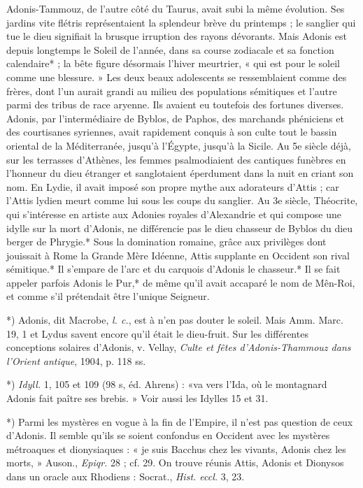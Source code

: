 \documentclass[a4paper, 11pt, oneside, polutonikogreek, french]{article}
\begin{document}
Adonis-Tammouz, de l'autre côté du Taurus, avait subi la même évolution. Ses jardins vite flétris représentaient la splendeur brève du printemps ; le sanglier qui tue le dieu signifiait la brusque irruption des rayons dévorants. Mais Adonis est depuis longtemps le Soleil de l'année, dans sa course zodiacale et sa fonction calendaire* ; la bête figure désormais l'hiver meurtrier, « qui est pour le soleil comme une blessure. » Les deux beaux adolescents se ressemblaient comme des frères, dont l'un aurait grandi au milieu des populations sémitiques et l'autre parmi des tribus de race aryenne. Ils avaient eu toutefois des fortunes diverses. Adonis, par l'intermédiaire de Byblos, de Paphos, des marchands phéniciens et des courtisanes syriennes, avait rapidement conquis à son culte tout le bassin oriental de la Méditerranée, jusqu'à l'Égypte, jusqu'à la Sicile. Au 5e siècle déjà, sur les terrasses d'Athènes, les femmes psalmodiaient des cantiques funèbres en l'honneur du dieu étranger et sanglotaient éperdument dans la nuit en criant son nom. En Lydie, il avait imposé son propre mythe aux adorateurs d'Attis ; car l'Attis lydien meurt comme lui sous les coups du sanglier. Au 3e siècle, Théocrite, qui s'intéresse en artiste aux Adonies royales d'Alexandrie et qui compose une idylle sur la mort d'Adonis, ne différencie pas le dieu chasseur de Byblos du dieu berger de Phrygie.* Sous la domination romaine, grâce aux privilèges dont jouissait à Rome la Grande Mère Idéenne, Attis supplante en Occident son rival sémitique.* Il s'empare de l'arc et du carquois d'Adonis le chasseur.* Il se fait appeler parfois Adonis le Pur,* de même qu'il avait accaparé le nom de Mên-Roi, et comme s'il prétendait être l'unique Seigneur.

*) Adonis, dit Macrobe, \emph{l. c.}, est à n'en pas douter le soleil. Mais Amm. Marc. 19, 1 et Lydus savent encore qu'il était le dieu-fruit. Sur les différentes conceptions solaires d'Adonis, v. Vellay, \emph{Culte et fêtes d'Adonis-Thammouz dans l'Orient antique}, 1904, p. 118 ss.

*) \emph{Idyll.} 1, 105 et 109 (98 s, éd. Ahrens) : «va vers l'Ida, où le montagnard Adonis fait paître ses brebis. » Voir aussi les Idylles 15 et 31.

*) Parmi les mystères en vogue à la fin de l'Empire, il n'est pas question de ceux d'Adonis. Il semble qu'ils se soient confondus en Occident avec les mystères métroaques et dionysiaques : « je suis Bacchus chez les vivants, Adonis chez les morts, » Auson., \emph{Epiqr.} 28 ; cf. 29. On trouve réunis Attis, Adonis et Dionysos dans un oracle aux Rhodiens : Socrat., \emph{Hist. eccl.} 3, 23.
\end{document}
